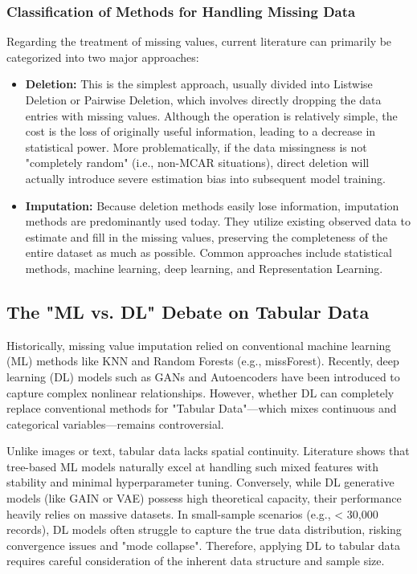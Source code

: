 \documentclass[twocolumn, 9pt]{extarticle}
\begin{document}
\subsubsection{Classification of Methods for Handling Missing Data}
Regarding the treatment of missing values, current literature can primarily be categorized into two major approaches\cite{zhou2024comprehensive}:
\begin{itemize}[itemsep=2pt, parsep=0pt, topsep=4pt]
    \item \textbf{Deletion:} This is the simplest approach, usually divided into Listwise Deletion or Pairwise Deletion, which involves directly dropping the data entries with missing values. Although the operation is relatively simple, the cost is the loss of originally useful information, leading to a decrease in statistical power. More problematically, if the data missingness is not "completely random" (i.e., non-MCAR situations), direct deletion will actually introduce severe estimation bias into subsequent model training.
    \item \textbf {Imputation:} Because deletion methods easily lose information, imputation methods are predominantly used today. They utilize existing observed data to estimate and fill in the missing values, preserving the completeness of the entire dataset as much as possible. Common approaches include statistical methods, machine learning, deep learning, and Representation Learning.
\end{itemize}

\subsection{The "ML vs. DL" Debate on Tabular Data}
Historically, missing value imputation relied on conventional machine learning (ML) methods like KNN and Random Forests (e.g., missForest). Recently, deep learning (DL) models such as GANs and Autoencoders have been introduced to capture complex nonlinear relationships.\cite{shahbazian2023generative} However, whether DL can completely replace conventional methods for "Tabular Data"—which mixes continuous and categorical variables—remains controversial.

Unlike images or text, tabular data lacks spatial continuity. Literature shows that tree-based ML models naturally excel at handling such mixed features with stability and minimal hyperparameter tuning. Conversely, while DL generative models (like GAIN or VAE) possess high theoretical capacity, their performance heavily relies on massive datasets. In small-sample scenarios (e.g., < 30,000 records), DL models often struggle to capture the true data distribution, risking convergence issues and "mode collapse".\cite{sun2023deep} Therefore, applying DL to tabular data requires careful consideration of the inherent data structure and sample size.
\end{document}
